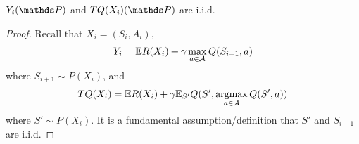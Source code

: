 
\begin{prop}
  $Y_i(\Prob)$ and $TQ(X_i)(\Prob)$ are i.i.d.
  \label{lem:YTQ}
\end{prop}
\begin{proof}
  Recall that $X_i = (S_i, A_i)$,
  \begin{align*}
    Y_i = \mathbb{E} R(X_i) + \gamma \max_{a \in \mathcal{A}} Q(S_{i+1}, a)
  \end{align*}
  where $S_{i+1} \sim P(X_i)$, and
  \begin{align*}
    TQ(X_i) = \mathbb{E} R(X_i) + \gamma \mathbb{E}_{S'} Q(S', \operatorname*{argmax}_{a \in \mathcal{A}} Q(S', a))
  \end{align*}
  where $S' \sim P(X_i)$.
  It is a fundamental assumption/definition that $S'$ and $S_{i+1}$ are
  i.i.d.
\end{proof}

